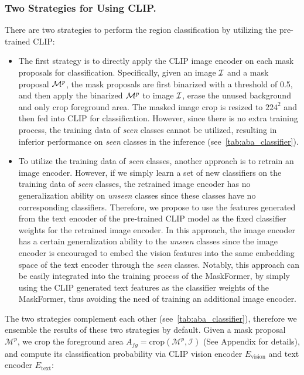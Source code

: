 \documentclass[runningheads]{llncs}
\begin{document}
\subsubsection{Two Strategies for Using CLIP.}
\label{sec:two_strategies}
There are two strategies to perform the region classification by utilizing the pre-trained CLIP:
\begin{itemize}
    \item The first strategy is to directly apply the CLIP image encoder on each mask proposals for classification. Specifically, given an image ${\cal I}$ and a mask proposal ${\cal M}^p$, the mask proposals are first binarized with a threshold of 0.5, and then apply the binarized ${\cal M}^p$ to image ${\cal I}$, erase the unused background and only crop foreground area. The masked image crop is resized to $224^2$ and then fed into CLIP for classification. However, since there is no extra training process, the training data of \emph{seen} classes cannot be utilized, resulting in inferior performance on \emph{seen} classes in the inference (see~\cref{tab:aba_classifier}).
    
    
    \item To utilize the training data of \emph{seen} classes, another approach is to retrain an image encoder. However, if we simply learn a set of new classifiers on the training data of \emph{seen} classes, the retrained image encoder has no generalization ability on \emph{unseen} classes since these classes have no corresponding classifiers. Therefore, we propose to use the features generated from the text encoder of the pre-trained CLIP model as the fixed classifier weights for the retrained image encoder. In this approach, the image encoder has a certain generalization ability to the \emph{unseen} classes since the image encoder is encouraged to embed the vision features into the same embedding space of the text encoder through the \emph{seen} classes.
    Notably, this approach can be easily integrated into the training process of the MaskFormer, by simply using the CLIP generated text features as the classifier weights of the MaskFormer, thus avoiding the need of training an additional image encoder.
\end{itemize}

The two strategies complement each other (see~\cref{tab:aba_classifier}), therefore we ensemble the results of these two strategies by default.
Given a mask proposal $\mathcal{M}^p$, we crop the foreground area $A_{fg}=\text{crop}(\mathcal{M}^p, \mathcal{I})$ (See Appendix for details), and compute its classification probability via CLIP vision encoder $E_{\text{vision}}$ and text encoder $E_{\text{text}}$:
\end{document}
